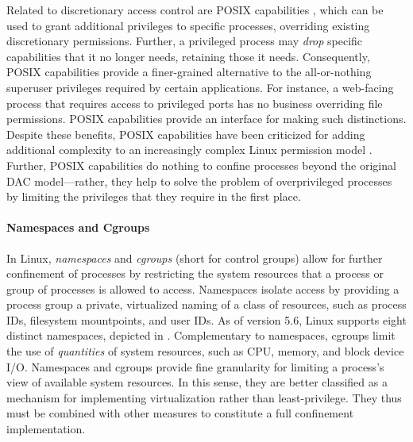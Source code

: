 Related to discretionary access control are POSIX capabilities \cite{posix_capabilities,corbet2006_capabities_a,corbet2006_capabities_b}, which can be used to grant additional privileges to specific processes, overriding existing discretionary permissions. Further, a privileged process may \textit{drop} specific capabilities that it no longer needs, retaining those it needs. Consequently, POSIX capabilities provide a finer-grained alternative to the all-or-nothing superuser privileges required by certain applications. For instance, a web-facing process that requires access to privileged ports has no business overriding file permissions. POSIX capabilities provide an interface for making such distinctions. Despite these benefits, POSIX capabilities have been criticized for adding additional complexity to an increasingly complex Linux permission model \cite{corbet2006_capabities_b,corbet2006_capabities_a}.  Further, POSIX capabilities do nothing to confine processes beyond the original DAC model---rather, they help to solve the problem of overprivileged processes by limiting the privileges that they require in the first place.

\paragraph*{Namespaces and Cgroups}

In Linux, \textit{namespaces} and \textit{cgroups} (short for control groups) allow for further confinement of processes by restricting the system resources that a process or group of processes is allowed to access. Namespaces isolate access by providing a process group a private, virtualized naming of a class of resources, such as process IDs, filesystem mountpoints, and user IDs. As of version 5.6, Linux supports eight distinct namespaces, depicted in .  Complementary to namespaces, cgroups limit the use of \textit{quantities} of system resources, such as CPU, memory, and block device I/O.  Namespaces and cgroups provide fine granularity for limiting a process's view of available system resources. In this sense, they are better classified as a mechanism for implementing virtualization rather than least-privilege. They thus must be combined with other measures to constitute a full confinement implementation.

